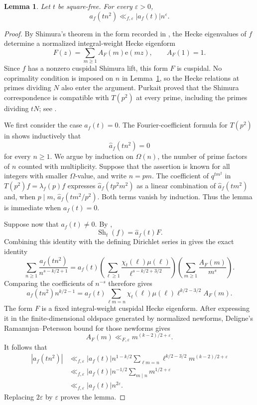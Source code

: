 \documentclass[10pt,a4paper]{amsart}
\newtheorem{lemma}[theorem]{Lemma}
\newcommand{\e}{\mathrm{e}}
\begin{document}
\begin{lemma}\label{lem:square-index}
Let $t$ be square-free. For every $\varepsilon>0$,
\[
a_f(tn^2)\ll_{f,\varepsilon}|a_f(t)|n^\varepsilon.
\]
\end{lemma}

\begin{proof}
By Shimura's theorem in the form recorded in
\cite[Theorem~2(iv)]{PurkaitDecomposition}, the Hecke eigenvalues of $f$ determine a normalized integral-weight Hecke
eigenform
\[
F(z)=\sum_{m\ge1}A_F(m)\e(mz),\qquad A_F(1)=1.
\]
Since $f$ has a nonzero cuspidal Shimura lift, this form $F$ is cuspidal.
No coprimality condition is imposed on $n$ in
Lemma~\ref{lem:square-index}, so the Hecke relations at primes dividing
$N$ also enter the argument. Purkait proved that the Shimura
correspondence is compatible with $T(p^2)$ at every prime, including the
primes dividing $tN$; see \cite[Theorem~1.2]{PurkaitHecke}.

We first consider the case $a_f(t)=0$. The Fourier-coefficient formula
for $T(p^2)$ in \cite[Theorem~2.1]{PurkaitHecke} shows inductively that
\[
\widehat a_f(tn^2)=0
\]
for every $n\ge1$. We argue by induction on $\Omega(n)$, the number of prime factors of $n$
counted with multiplicity. Suppose that the assertion is known for all
integers with smaller $\Omega$-value, and write $n=pm$. The coefficient of
$q^{tm^2}$ in $T(p^2)f=\lambda_f(p)f$ expresses
$\widehat a_f(tp^2m^2)$ as a linear combination of
$\widehat a_f(tm^2)$ and, when $p\mid m$,
$\widehat a_f(tm^2/p^2)$. Both terms vanish by induction. Thus the lemma
is immediate when $a_f(t)=0$.

Suppose now that $a_f(t)\ne0$. By
\cite[Theorem~2(iv)]{PurkaitDecomposition},
\[
\operatorname{Sh}_t(f)=\widehat a_f(t)F.
\]
Combining this identity with the defining Dirichlet series in
\cite[Theorem~2]{PurkaitDecomposition} gives the exact identity
\[
\sum_{n\ge1}\frac{a_f(tn^2)}{n^{s-k/2+1}}
=a_f(t)
\left(\sum_{\ell\ge1}\frac{\chi_t(\ell)\mu(\ell)}
{\ell^{s-k/2+3/2}}\right)
\left(\sum_{m\ge1}\frac{A_F(m)}{m^s}\right).
\tag{3.1}
\]
Comparing the
coefficients of $n^{-s}$ therefore gives
\[
a_f(tn^2)n^{k/2-1}
=a_f(t)\sum_{\ell m=n}\chi_t(\ell)\mu(\ell)
\ell^{k/2-3/2}A_F(m).
\]
The form $F$ is a fixed integral-weight cuspidal Hecke eigenform. After
expressing it in the finite-dimensional oldspace generated by normalized
newforms, Deligne's Ramanujan--Petersson bound for those newforms
\cite{Deligne} gives
\[
A_F(m)\ll_{F,\varepsilon}m^{(k-2)/2+\varepsilon}.
\]
It follows that
\begin{align*}
|a_f(tn^2)|
&\ll_{f,\varepsilon}|a_f(t)|n^{1-k/2}
  \sum_{\ell m=n}\ell^{k/2-3/2}m^{(k-2)/2+\varepsilon}\\
&\ll_{f,\varepsilon}|a_f(t)|n^{-1/2}
  \sum_{m\mid n}m^{1/2+\varepsilon}\\
&\ll_{f,\varepsilon}|a_f(t)|n^{2\varepsilon}.
\end{align*}
Replacing $2\varepsilon$ by $\varepsilon$ proves the lemma.
\end{proof}
\end{document}
